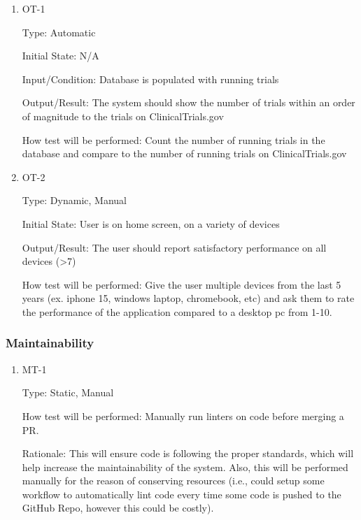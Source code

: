 \documentclass[12pt, titlepage]{article}
\begin{document}
\begin{enumerate}

\item{OT-1\\}

Type: Automatic
					
Initial State: N/A
					
Input/Condition: Database is populated with running trials
					
Output/Result: The system should show the number of trials within an order of magnitude to the trials on ClinicalTrials.gov
					
How test will be performed: Count the number of running trials in the database and compare to the number of 
running trials on ClinicalTrials.gov

\item{OT-2\\}

Type: Dynamic, Manual
					
Initial State: User is on home screen, on a variety of devices
					
Output/Result: The user should report satisfactory performance on all devices (>7)
					
How test will be performed: Give the user multiple devices from the last 5 years (ex. iphone 15, windows laptop, chromebook, etc)
and ask them to rate the performance of the application compared to a desktop pc from 1-10.

\end{enumerate}

\subsubsection{Maintainability}

\begin{enumerate}

\item{MT-1\\}

Type: Static, Manual
					
How test will be performed: Manually run linters on code before merging a PR.

Rationale: This will ensure code is following the proper standards, which will help increase the maintainability of the system.
Also, this will be performed manually for the reason of conserving resources (i.e., could setup some workflow to automatically lint 
code every time some code is pushed to the GitHub Repo, however this could be costly).

\end{enumerate}
\end{document}
